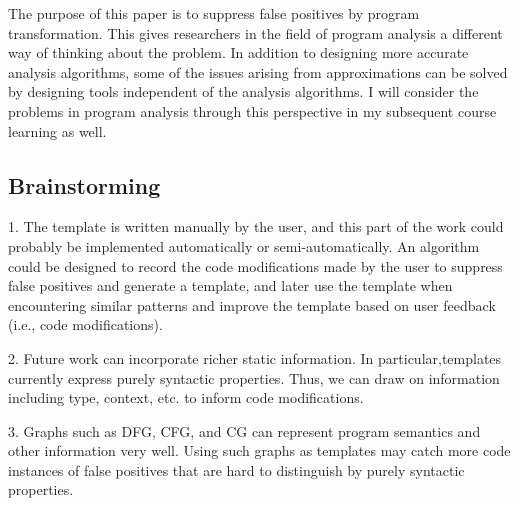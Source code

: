 \documentclass[conference]{IEEEtran}
\begin{document}
The purpose of this paper is to suppress false positives by program transformation. This gives researchers in the field of program analysis a different way of thinking about the problem. In addition to designing more accurate analysis algorithms, some of the issues arising from approximations can be solved by designing tools independent of the analysis algorithms. I will consider the problems in program analysis through this perspective in my subsequent course learning as well.

\subsection{Brainstorming}
1. The template is written manually by the user, and this part of the work could probably be implemented automatically or semi-automatically. An algorithm could be designed to record the code modifications made by the user to suppress false positives and generate a template, and later use the template when encountering similar patterns and improve the template based on user feedback (i.e., code modifications).

2. Future work can incorporate richer static information. In particular,templates currently express purely syntactic properties. Thus, we can draw on information including type, context, etc. to inform code modifications.

3. Graphs such as DFG, CFG, and CG can represent program semantics and other information very well. Using such graphs as templates may catch more code instances of false positives that are hard to distinguish by purely syntactic properties.



\end{document}
